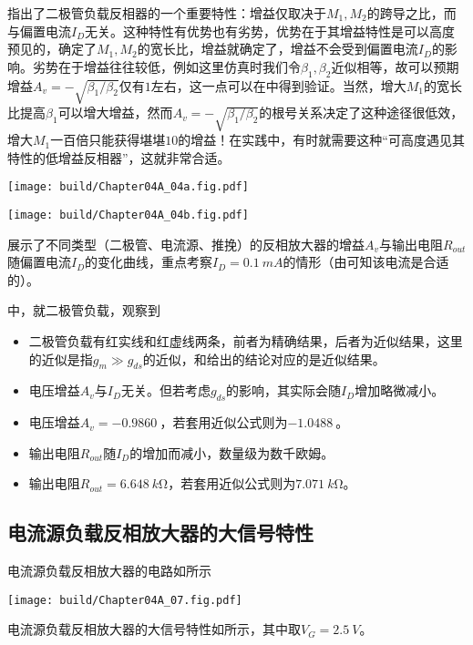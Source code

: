 指出了二极管负载反相器的一个重要特性：增益仅取决于$M_1,M_2$的跨导之比，而与偏置电流$I_D$无关。这种特性有优势也有劣势，优势在于其增益特性是可以高度预见的，确定了$M_1,M_2$的宽长比，增益就确定了，增益不会受到偏置电流$I_D$的影响。劣势在于增益往往较低，例如这里仿真时我们令$\beta_1,\beta_2$近似相等，故可以预期增益$A_v=-\sqrt{\beta_1/\beta_2}$仅有$1$左右，这一点可以在中得到验证。当然，增大$M_1$的宽长比提高$\beta_1$可以增大增益，然而$A_v=-\sqrt{\beta_1/\beta_2}$的根号关系决定了这种途径很低效，增大$M_1$一百倍只能获得堪堪$10$的增益！在实践中，有时就需要这种“可高度遇见其特性的低增益反相器”，这就非常合适。

\begin{Figure}[反相放大器的特性与偏置的关系]
    \begin{FigureSub}
        \texttt{[image: build/Chapter04A\_04a.fig.pdf]}
    \end{FigureSub}
    \begin{FigureSub}
        \texttt{[image: build/Chapter04A\_04b.fig.pdf]}
    \end{FigureSub}
\end{Figure}

展示了不同类型（二极管、电流源、推挽）的反相放大器的增益$A_v$与输出电阻$R_{out}$随偏置电流$I_D$的变化曲线，重点考察$I_D=\SI{0.1}{mA}$的情形（由可知该电流是合适的）。

中，就二极管负载，观察到
\begin{itemize}
    \item 二极管负载有红实线和红虚线两条，前者为精确结果，后者为近似结果，这里的近似是指$g_{m}\gg g_{ds}$的近似，和给出的结论对应的是近似结果。
    \item 电压增益$A_v$与$I_D$无关。但若考虑$g_{ds}$的影响，其实际会随$I_D$增加略微减小。
    \item 电压增益$A_v=\SI{-0.9860}{}$，若套用近似公式则为$\SI{-1.0488}{}$。
    \item 输出电阻$R_{out}$随$I_D$的增加而减小，数量级为数千欧姆。
    \item 输出电阻$R_{out}=\SI{6.648}{k\ohm}$，若套用近似公式则为$\SI{7.071}{k\ohm}$。
\end{itemize}

\subsection{电流源负载反相放大器的大信号特性}
电流源负载反相放大器的电路如所示
\begin{Figure}[电流源负载反相放大器]
    \texttt{[image: build/Chapter04A\_07.fig.pdf]}
\end{Figure}
电流源负载反相放大器的大信号特性如所示，其中取$V_G=\SI{2.5}{V}$。

